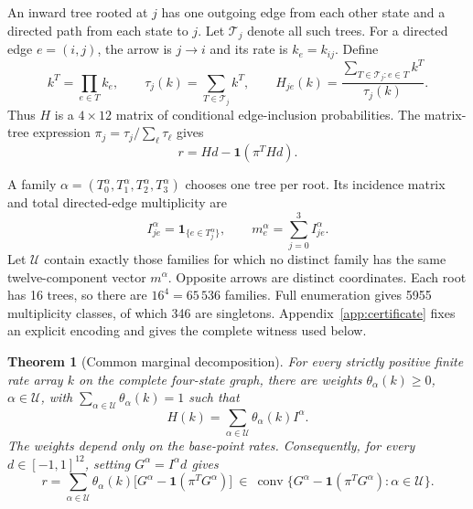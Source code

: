 \documentclass[11pt,a4paper]{article}
\newtheorem{theorem}{Theorem}
\DeclareMathOperator{\conv}{conv}
\newcommand{\U}{\mathcal U}
\newcommand{\T}{\mathcal T}
\newcommand{\one}{\mathbf 1}
\begin{document}
An inward tree rooted at $j$ has one outgoing edge from each other state
and a directed path from each state to $j$. Let $\T_j$ denote all such
trees. For a directed edge $e=(i,j)$, the arrow is $j\to i$ and its rate
is $k_e=k_{ij}$. Define
\begin{equation}
 k^T=\prod_{e\in T}k_e,\qquad
 \tau_j(k)=\sum_{T\in\T_j}k^T,\qquad
 H_{je}(k)=\frac{\sum_{T\in\T_j:e\in T}k^T}{\tau_j(k)}.
 \label{eq:tree}
\end{equation}
Thus $H$ is a $4\times12$ matrix of conditional edge-inclusion
probabilities. The matrix-tree expression
$\pi_j=\tau_j/\sum_\ell\tau_\ell$ gives
\begin{equation}
 r=Hd-\one(\pi^THd).
 \label{eq:tree-response}
\end{equation}

A family $\alpha=(T_0^\alpha,T_1^\alpha,T_2^\alpha,T_3^\alpha)$
chooses one tree per root. Its incidence matrix and total directed-edge
multiplicity are
\begin{equation}
 I^\alpha_{je}=\one_{\{e\in T_j^\alpha\}},\qquad
 m_e^\alpha=\sum_{j=0}^3 I^\alpha_{je}.
 \label{eq:unique}
\end{equation}
Let $\U$ contain exactly those families for which no distinct family has
the same twelve-component vector $m^\alpha$. Opposite arrows are distinct
coordinates. Each root has 16 trees, so there are $16^4=65\,536$ families.
Full enumeration gives 5955 multiplicity classes, of which 346 are
singletons. Appendix~\ref{app:certificate} fixes an explicit encoding
and gives the complete witness used below.

\begin{theorem}[Common marginal decomposition]
\label{thm:main}
For every strictly positive finite rate array $k$ on the complete
four-state graph, there are weights $\theta_\alpha(k)\ge0$,
$\alpha\in\U$, with $\sum_{\alpha\in\U}\theta_\alpha(k)=1$ such that
\begin{equation}
 H(k)=\sum_{\alpha\in\U}\theta_\alpha(k)I^\alpha.
 \label{eq:main}
\end{equation}
The weights depend only on the base-point rates. Consequently, for every
$d\in[-1,1]^{12}$, setting $G^\alpha=I^\alpha d$ gives
\begin{equation}
 r=\sum_{\alpha\in\U}\theta_\alpha(k)
       \bigl[G^\alpha-\one(\pi^TG^\alpha)\bigr]
 \ \in\ \conv\{G^\alpha-\one(\pi^TG^\alpha):\alpha\in\U\}.
 \label{eq:response-hull}
\end{equation}
\end{theorem}
\end{document}
